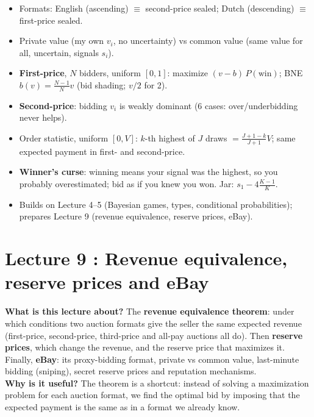 \documentclass[11pt,a4paper,openany]{book}
\begin{document}
\begin{keybox}[title=Exam recap]
\begin{itemize}
  \item Formats: English (ascending) $\equiv$ second-price sealed; Dutch (descending)
        $\equiv$ first-price sealed.
  \item Private value (my own $v_i$, no uncertainty) vs common value (same value for all,
        uncertain, signals $s_i$).
  \item \textbf{First-price}, $N$ bidders, uniform $[0,1]$: maximize
        $(v - b)\,P(\text{win})$; BNE $b(v) = \frac{N-1}{N} v$ (bid shading; $v/2$ for 2).
  \item \textbf{Second-price}: bidding $v_i$ is weakly dominant (6 cases: over/underbidding
        never helps).
  \item Order statistic, uniform $[0,V]$: $k$-th highest of $J$ draws $= \frac{J+1-k}{J+1}V$;
        same expected payment in first- and second-price.
  \item \textbf{Winner's curse}: winning means your signal was the highest, so you probably
        overestimated; bid as if you knew you won. Jar: $s_1 - 4\frac{K-1}{K}$.
  \item Builds on Lecture 4--5 (Bayesian games, types, conditional probabilities); prepares
        Lecture 9 (revenue equivalence, reserve prices, eBay).
\end{itemize}
\end{keybox}


\chapter{Lecture 9 : Revenue equivalence, reserve prices and eBay}

\begin{rembox}[title=In a nutshell]
\textbf{What is this lecture about?} The \textbf{revenue equivalence theorem}: under which
conditions two auction formats give the seller the same expected revenue (first-price,
second-price, third-price and all-pay auctions all do). Then \textbf{reserve prices}, which
change the revenue, and the reserve price that maximizes it. Finally, \textbf{eBay}: its
proxy-bidding format, private vs common value, last-minute bidding (sniping), secret reserve
prices and reputation mechanisms. \\
\textbf{Why is it useful?} The theorem is a shortcut: instead of solving a maximization
problem for each auction format, we find the optimal bid by imposing that the expected
payment is the same as in a format we already know.
\end{rembox}
\end{document}
